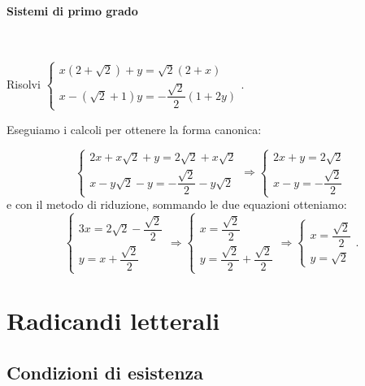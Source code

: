 \paragraph{Sistemi di primo grado}~

\begin{esempio}{}{}
Risolvi \(\left\{\begin{array}{l}
{x(2+\sqrt{2})+y=\sqrt{2}(2+x)}\\
{x-(\sqrt{2}+1)y=-\dfrac{\sqrt{2}} 2(1+2y)}
\end{array}
\right..\)

Eseguiamo i calcoli per ottenere la forma canonica:

\[\left\{\begin{array}{l}
{2x+x\sqrt{2}+y=2\sqrt{2}+x\sqrt{2}}\\
{x-y\sqrt{2}-y=-\dfrac{\sqrt{2}} 2-y\sqrt{2}}
\end{array}
\right.\Rightarrow
\left\{\begin{array}{l}
{2x+y=2\sqrt{2}}\\
{x-y=-\dfrac{\sqrt{2}} 2}
\end{array}
\right.\]
e con il metodo di riduzione, sommando le due equazioni otteniamo:
\[\left\{\begin{array}{l}
{3x = 2\sqrt{2}-\dfrac{\sqrt{2}} 2}\\
{y = x +\dfrac{\sqrt{2}}{2}}
\end{array}
\right.\Rightarrow
\left\{\begin{array}{l}
{x=\dfrac{\sqrt{2}} 2}\\
{y=\dfrac{\sqrt{2}}{2} + \dfrac{\sqrt{2}}{2}}
\end{array}
\right.\Rightarrow
\left\{\begin{array}{l}
{x=\dfrac{\sqrt{2}} 2}\\
{y=\sqrt{2}}
\end{array}
\right..\]
\end{esempio}
% 

\section{Radicandi letterali}
\label{sec:radicali_letterali}

\subsection{Condizioni di esistenza}
\label{subsec:radicali_condizioni_esistenza}

